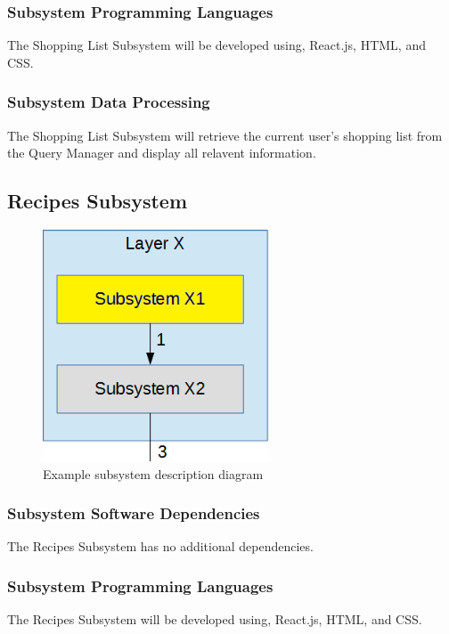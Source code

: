 \subsubsection{Subsystem Programming Languages}
The Shopping List Subsystem will be developed using, React.js, HTML, and CSS.

\subsubsection{Subsystem Data Processing}
The Shopping List Subsystem will retrieve the current user's shopping list from the Query Manager and display all relavent information.

\subsection{Recipes Subsystem}

\begin{figure}[h!]
	\centering
 	\includegraphics[width=0.60\textwidth]{images/subsystem}
 \caption{Example subsystem description diagram}
\end{figure}

\subsubsection{Subsystem Software Dependencies}
The Recipes Subsystem has no additional dependencies.

\subsubsection{Subsystem Programming Languages}
The Recipes Subsystem will be developed using, React.js, HTML, and CSS.

